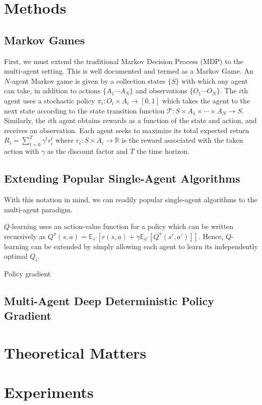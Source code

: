 \documentclass{llncs}
\begin{document}
\section{Methods}
\subsection{Markov Games}
First, we must extend the traditional Markov Decision Process (MDP) to the multi-agent setting. This is well documented and termed as a Markov Game\cite{leibo2017multi}. An $N$-agent Markov game is given by a collection states $\{ S \}$ with which any agent can take, in addition to actions $\{ A_1 \cdots A_N \}$ and observations $\{ O_1 \cdots O_N \}$. The $i$th agent uses a stochastic policy $\pi_i : O_i \times A_i \rightarrow [0,1]$ which takes the agent to the next state according to the state transition function $\mathcal{T}: S \times A_1 \times \cdots \times A_N \rightarrow S$. Similarly, the $i$th agent obtains rewards as a function of the state and action, and receives an observation. Each agent seeks to maximize its total expected return $R_i = \sum_{t=0}^T \gamma^t r_i^t$ where $r_i : S \times A_i \rightarrow \mathbb{R}$ is the reward associated with the taken action with $\gamma$ as the discount factor and $T$ the time horizon.  
%
\subsection{Extending Popular Single-Agent Algorithms}
With this notation in mind, we can readily popular single-agent algorithms to the multi-agent paradigm.

$Q$-learning uses an action-value function for a policy which can be written recursively as $Q^\pi(s,a)= \mathbb{E}_{s'}[r(s,a) + \gamma \mathbb{E}_{a'}[Q^\pi(s', a')]]$. Hence, $Q$-learning can be extended by simply allowing each agent to learn its independently optimal $Q_i$. 

Policy gradient 

\subsection{Multi-Agent Deep Deterministic Policy Gradient}

\section{Theoretical Matters}

\section{Experiments}
\end{document}
